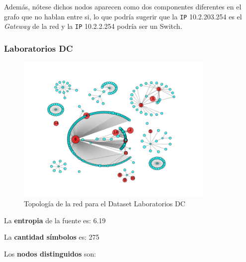 Además, nótese dichos nodos aparecen como dos componentes diferentes en el grafo que no hablan entre si,
lo que podría sugerir que la \texttt{IP} 10.2.203.254 es el \textit{Gateway} de la red
y la \texttt{IP} 10.2.2.254 podría ser un Switch.

\subsubsection{Laboratorios DC}

\begin{figure}[H]
    \centering
    \includegraphics[width=0.85\textwidth]{imagenes/labosDC.png}
    \caption{Topología de la red para el Dataset Laboratorios DC}
\end{figure}

La \textbf{entropia} de la fuente es: 6.19

La \textbf{cantidad símbolos} es: 275

Los \textbf{nodos distinguidos} son:

